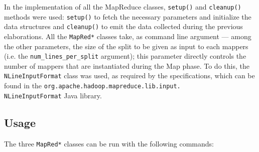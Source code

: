 In the implementation of all the MapReduce classes, \texttt{setup()} and \texttt{cleanup()} methods were used: \texttt{setup()} to fetch the necessary parameters and initialize the data structures and \texttt{cleanup()} to emit the data collected during the previous elaborations.
\hfill \break
All the \texttt{MapRed*} classes take, as command line argument --- among the other parameters, the size of the split to be given as input to each mappers (i.e. the \texttt{num\_lines\_per\_split} argument); this parameter directly controls the number of mappers that are instantiated during the Map phase. To do this, the \texttt{NLineInputFormat} class was used, as required by the specifications, which can be found in the \texttt{org.apache.hadoop.mapreduce.lib.input.\\NLineInputFormat} Java library.\\
\hfill \break

\subsection*{Usage}\label{sub:usage}
The three \texttt{MapRed*} classes can be run with the following commands:\\

